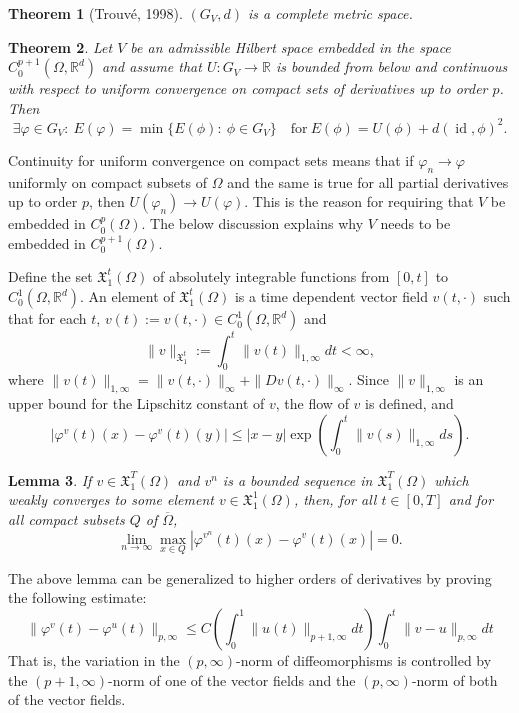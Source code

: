 \documentclass[a5paper,11pt,twoside]{article}
\theoremstyle{plain}
\newtheorem{teo}{Theorem}[section]
\newtheorem{lem}[teo]{Lemma}
\newcommand{\R}{\ensuremath{\mathbb{R}}}
\newcommand{\X}{\ensuremath{\mathfrak{X}}}
\newcommand{\id}{\operatorname{id}}
\theoremstyle{definition}
\begin{document}
\begin{teo}[Trouvé, 1998]
$(G_V,d)$ is a complete metric space.
\end{teo}



\begin{teo}
Let $V$ be an admissible Hilbert space embedded in the space $C_0^{p+1}(\Omega,\R^d)$ and assume that $U:G_V\to\R$ is bounded from below and continuous with respect to uniform convergence on compact sets of derivatives up to order $p$. Then
\[
\exists \varphi\in G_V:\ E(\varphi)=\min\{E(\phi):\ \phi\in G_V\}\quad \mathrm{for\ } E(\phi)=U(\phi)+d(\id,\phi)^2.
\]
\end{teo}

Continuity for uniform convergence on compact sets means that if $\varphi_n\to\varphi$ uniformly on compact subsets of $\Omega$ and the same is true for all partial derivatives up to order $p$, then $U(\varphi_n)\to U(\varphi)$. This is the reason for requiring that $V$ be embedded in $C_0^p(\Omega)$. 
The below discussion explains why $V$ needs to be embedded in $C^{p+1}_0(\Omega)$.


Define the set $\X_1^t(\Omega)$ of absolutely integrable functions from $[0,t]$ to $C_0^1(\Omega,\R^d)$. An element of $\X_1^t(\Omega)$ is a time dependent vector field $v(t,\cdot)$ such that for each $t$, $v(t):=v(t,\cdot)\in C_0^1(\Omega,\R^d)$ and
\[
\|v\|_{\X_1^t}:=\int_0^t\|v(t)\|_{1,\infty}dt<\infty,
\]
where $\|v(t)\|_{1,\infty}=\|v(t,\cdot)\|_\infty+\|Dv(t,\cdot)\|_\infty$. Since $\|v\|_{1,\infty}$ is an upper bound for the Lipschitz constant of $v$, the flow of $v$ is defined, and
%
\begin{equation}
|\varphi^v(t)(x)-\varphi^v(t)(y)|\leq |x-y|\exp\left(\int_0^t\|v(s)\|_{1,\infty}ds\right).
\end{equation}

\begin{lem}\label{pointwise}
If $v\in\X_1^T(\Omega)$ and $v^n$ is a bounded sequence in $\X_1^T(\Omega)$ which weakly converges to some element $v\in\X_1^1(\Omega)$, then, for all $t\in[0,T]$ and for all compact subsets $Q$ of $\overline{\Omega}$,
\[
\lim_{n\to\infty}\max_{x\in Q}\left|\varphi^{v^n}(t)(x)-\varphi^{v}(t)(x)\right|=0.
\]
\end{lem}
The above lemma can be generalized to higher orders of derivatives by proving the following estimate:
%
\begin{equation} 
\label{eq:estimate}
\|\varphi^v(t)-\varphi^{u}(t)\|_{p,\infty}\leq C\left(\int_0^1\|u(t)\|_{p+1,\infty}dt\right)\int_0^t\|v-u\|_{p,\infty} dt
\end{equation}
%
That is, the variation in the $(p,\infty)$-norm of diffeomorphisms is controlled by the $(p+1,\infty)$-norm of one of the vector fields and the $(p,\infty)$-norm of both of the vector fields.
\end{document}
